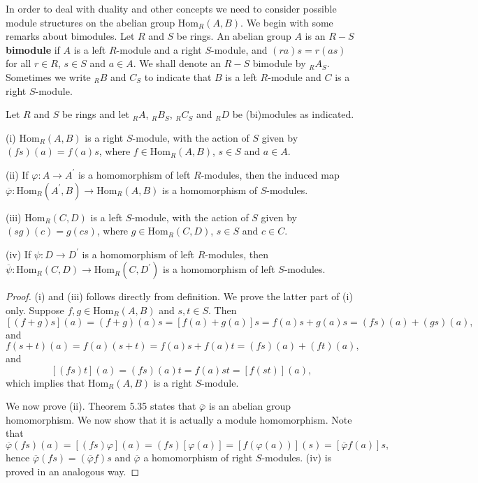 In order to deal with duality and other concepts we need to consider possible module structures on the abelian group $\mathrm{Hom}_R(A,B)$. We begin with some remarks about bimodules. Let $R$ and $S$ be rings. An abelian group $A$ is an $R-S$ \textbf{bimodule} if $A$ is a left $R$-module and a right $S$-module, and $(ra)s=r(as)$ for all $r\in R$, $s\in S$ and $a\in A$. We shall denote an $R-S$ bimodule by $_RA_S$. Sometimes we write $_RB$ and $C_S$ to indicate that $B$ is a left $R$-module and $C$ is a right $S$-module.\par
\begin{theorem}
Let $R$ and $S$ be rings and let $_RA$, $_RB_S$, $_RC_S$ and $_RD$ be (bi)modules as indicated.\par
(i) $\mathrm{Hom}_R(A,B)$ is a right $S$-module, with the action of $S$ given by $(fs)(a)=f(a)s$, where $f\in\mathrm{Hom}_R(A,B)$, $s\in S$ and $a\in A$.\par
(ii) If $\varphi:A\to A^\prime$ is a homomorphism of left $R$-modules, then the induced map $\overline{\varphi}:\mathrm{Hom}_R(A^\prime,B)\to\mathrm{Hom}_R(A,B)$ is a homomorphism of $S$-modules.\par
(iii) $\mathrm{Hom}_R(C,D)$ is a left $S$-module, with the action of $S$ given by $(sg)(c)=g(cs)$, where $g\in\mathrm{Hom}_R(C,D)$, $s\in S$ and $c\in C$.\par
(iv) If $\psi:D\to D^\prime$ is a homomorphism of left $R$-modules, then $\overline{\psi}:\mathrm{Hom}_R(C,D)\to\mathrm{Hom}_R(C,D^\prime)$ is a homomorphism of left $S$-modules.
\end{theorem}
\begin{proof}
(i) and (iii) follows directly from definition. We prove the latter part of  (i) only. Suppose $f,g\in\mathrm{Hom}_R(A,B)$ and $s,t\in S$. Then 
$$
\left[ \left( f+g \right) s \right] \left( a \right) =\left( f+g \right) \left( a \right) s=\left[ f\left( a \right) +g\left( a \right) \right] s=f\left( a \right) s+g\left( a \right) s=\left( fs \right) \left( a \right) +\left( gs \right) \left( a \right) ,
$$
and 
$$
f\left( s+t \right) \left( a \right) =f\left( a \right) \left( s+t \right) =f\left( a \right) s+f\left( a \right) t=\left( fs \right) \left( a \right) +\left( ft \right) \left( a \right) ,
$$
and 
$$
\left[ \left( fs \right) t \right] \left( a \right) =\left( fs \right) \left( a \right) t=f\left( a \right) st=\left[ f\left( st \right) \right] \left( a \right) ,
$$
which implies that $\mathrm{Hom}_R(A,B)$ is a right $S$-module.\par
We now prove (ii). Theorem 5.35 states that $\overline{\varphi}$ is an abelian group homomorphism. We now show that it is actually a module homomorphism. Note that 
$$
\overline{\varphi }\left( fs \right) \left( a \right) =\left[ \left( fs \right) \varphi \right] \left( a \right) =\left( fs \right) \left[ \varphi \left( a \right) \right] =\left[ f\left( \varphi \left( a \right) \right) \right] \left( s \right) =\left[ \overline{\varphi }f\left( a \right) \right] s,
$$
hence $\overline{\varphi }\left( fs \right) =\left( \overline{\varphi }f \right) s$ and $\overline{\varphi}$ a homomorphism of right $S$-modules. (iv) is proved in an analogous way.
\end{proof}
